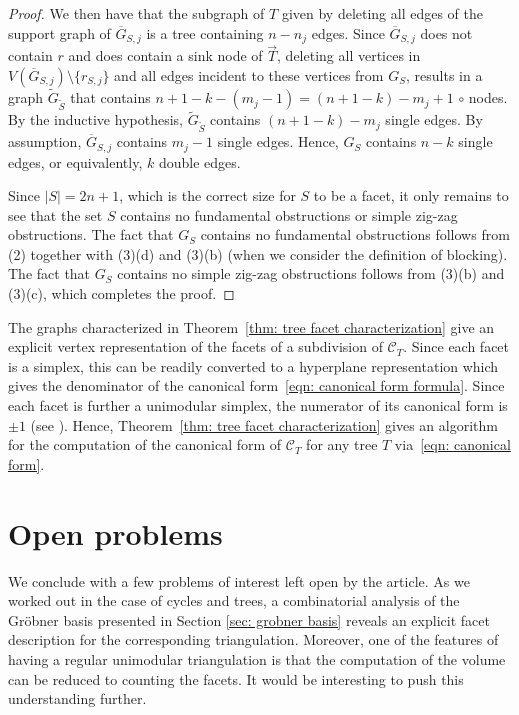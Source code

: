 \begin{proof}
We then have that the subgraph of $T$ given by deleting all edges of the support graph of $\overline{G}_{S,j}$ is a tree containing $n-n_j$ edges.  
Since $\overline{G}_{S,j}$ does not contain $r$ and does contain a sink node of $\overrightarrow{T}$, deleting all vertices in $V(\overline{G}_{S,j})\setminus \{r_{S,j}\}$ and all edges incident to these vertices from $G_S$, results in a graph $\widetilde{G}_{\tilde{S}}$ that contains $n+1-k-(m_j-1) = (n+1 - k) -m_j+1$ $\circ$ nodes. 
By the inductive hypothesis, $\widetilde{G}_{\widetilde{S}}$ contains $(n+1-k) - m_j$ single edges. 
By assumption, $\overline{G}_{S,j}$ contains $m_j-1$ single edges.  
Hence, $G_S$ contains $n-k$ single edges, or equivalently, $k$ double edges.  

Since $|S| = 2n+1$, which is the correct size for $S$ to be a facet, it only remains to see that the set $S$ contains no fundamental obstructions or simple zig-zag obstructions.  
The fact that $G_S$ contains no fundamental obstructions follows from (2) together with (3)(d) and (3)(b) (when we consider the definition of blocking).  
The fact that $G_S$ contains no simple zig-zag obstructions follows from (3)(b) and (3)(c), which completes the proof. 
\end{proof}

\begin{rema}
    The graphs characterized in Theorem~\ref{thm: tree facet characterization} give an explicit vertex representation of the facets of a subdivision of $\mathcal{C}_T$. 
    Since each facet is a simplex, this can be readily converted to a hyperplane representation which gives the denominator of the canonical form~\eqref{eqn: canonical form formula}.
    Since each facet is further a unimodular simplex, the numerator of its canonical form is $\pm1$ (see \cite[Section~1]{lam2022invitation}). 
    Hence, Theorem~\ref{thm: tree facet characterization} gives an algorithm for the computation of the canonical form of $\mathcal{C}_T$ for any tree $T$ via~\eqref{eqn: canonical form}.
\end{rema}

\section{Open problems}

We conclude with a few problems of interest left open by the article. As we worked out in the case of cycles and trees, a combinatorial analysis of the Gr\"{o}bner basis presented in Section \ref{sec: grobner basis} reveals an explicit facet description for the corresponding triangulation. Moreover, one of the features of having a regular unimodular triangulation is that the computation of the volume can be reduced to counting the facets. It would be interesting to push this understanding further. 

